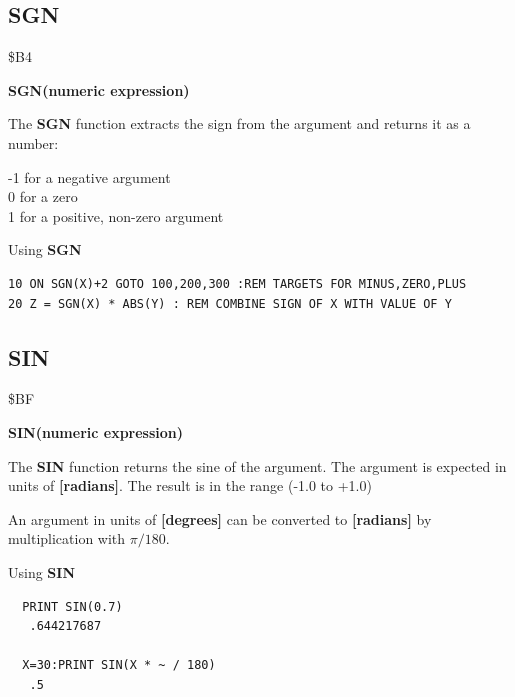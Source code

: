 \subsection{SGN}
\begin{description}[leftmargin=2cm,style=nextline]
\item [Token:] \$B4
\item [Format:] {\bf SGN(numeric expression)}
\item [Usage:] The {\bf SGN} function extracts the sign from
               the argument and returns it as a number:

               -1 for a negative argument \\
                0 for a zero              \\
                1 for a positive, non-zero argument

\item [Example:] Using {\bf SGN}
\begin{tcolorbox}[colback=black,coltext=white]
\verbatimfont{\codefont}
\begin{verbatim}
10 ON SGN(X)+2 GOTO 100,200,300 :REM TARGETS FOR MINUS,ZERO,PLUS
20 Z = SGN(X) * ABS(Y) : REM COMBINE SIGN OF X WITH VALUE OF Y
\end{verbatim}
\end{tcolorbox}
\end{description}


\newpage
\subsection{SIN}
\begin{description}[leftmargin=2cm,style=nextline]
\item [Token:] \$BF
\item [Format:] {\bf SIN(numeric expression)}
\item [Usage:] The {\bf SIN} function returns the sine of the
               argument.
               The argument is expected in units of {\bf [radians]}.
               The result is in the range (-1.0 to +1.0)

\item [Remarks:] An argument in units of {\bf [degrees]}
                 can be converted to {\bf [radians]}
               by multiplication with $\pi/180$.
\item [Example:] Using {\bf SIN}
\begin{tcolorbox}[colback=black,coltext=white]
\verbatimfont{\codefont}
\begin{verbatim}
  PRINT SIN(0.7)
   .644217687

  X=30:PRINT SIN(X * ~ / 180)
   .5
\end{verbatim}
\end{tcolorbox}
\end{description}

